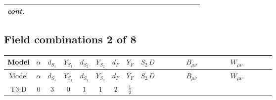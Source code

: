 \documentclass[8pt]{article}
\begin{document}
\begin{landscape}
\begin{longtable}{@{}cccccccc >{\raggedright\arraybackslash}p{0.21\linewidth} >{\raggedright\arraybackslash}p{0.21\linewidth} >{\raggedright\arraybackslash}p{0.21\linewidth}@{}}
\textit{cont.} &  &  &  &  &  &  &  & \scriptsize\adjustbox{max width=\linewidth}{$\begin{gathered} -\frac{2 \hbar  \overline{y_{1,i_1,r_1}} S_{1,j_3} S_{1,j_4} y_{1,i_1,r_1} S_{1,j_1}{}^{\dagger } S_{1,j_2}{}^{\dagger } \mathcal{I}_{S_1,j_1,j_3,j_2,j_4}{}^2 \lambda_{S_1}^{(1)}^{(2)}}{\sqrt{3} \epsilon } \\ -\frac{\hbar  \overline{y_{1,i_1,r_1}} S_{1,j_3} S_{1,j_4} y_{1,i_1,r_1} S_{1,j_1}{}^{\dagger } S_{1,j_2}{}^{\dagger } \mathcal{I}_{S_1,j_1,j_3,j_2,j_4}{}^2 \lambda_{S_1}^{(1)}^{(2)}}{\sqrt{3}}\end{gathered}$} &  &  \\
\midrule
\bottomrule
\end{longtable}
\clearpage
\subsection*{Field combinations 2 of 8}
\begin{longtable}{@{}cccccccc >{\raggedright\arraybackslash}p{0.21\linewidth} >{\raggedright\arraybackslash}p{0.21\linewidth} >{\raggedright\arraybackslash}p{0.21\linewidth}@{}}
\toprule
Model & $\alpha$ & $d_{S_1}$ & $Y_{S_1}$ & $d_{S_2}$ & $Y_{S_2}$ & $d_F$ & $Y_F$ & $S_2\,D$ & $B_{\mu\nu}$ & $W_{\mu\nu}$ \\
\midrule
\endfirsthead
\toprule
Model & $\alpha$ & $d_{S_1}$ & $Y_{S_1}$ & $d_{S_2}$ & $Y_{S_2}$ & $d_F$ & $Y_F$ & $S_2\,D$ & $B_{\mu\nu}$ & $W_{\mu\nu}$ \\
\midrule
\endhead
T3-D & $0$ & $3$ & $0$ & $1$ & $1$ & $2$ & $\frac{1}{2}$ & \scriptsize\adjustbox{max width=\linewidth}{$\begin{gathered} +D_{\mu _1}\left(S_2\right){}^{\dagger } D_{\mu _1}\left(S_2\right)\end{gathered}$} & \scriptsize\adjustbox{max width=\linewidth}{$\begin{gathered} -\frac{\hbar  B_{\mu _1\mu _2}^2}{2 \epsilon }\end{gathered}$} & \scriptsize\adjustbox{max width=\linewidth}{$\begin{gathered} -\frac{\hbar  \left(W_{\mu _1\mu _2}^{A_1}\right){}^2}{2 \epsilon }\end{gathered}$} \\
\midrule
\bottomrule
\end{longtable}
\clearpage

\end{landscape}
\end{document}
